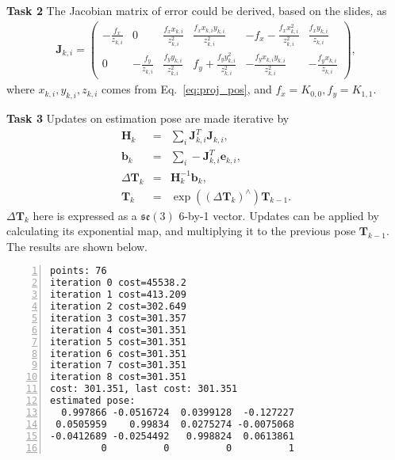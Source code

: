 \documentclass[12pt,a4paper]{article}
\newcommand{\vct}[1]{\boldsymbol{#1}}
\newcommand{\mtx}[1]{\mathbf{#1}}
\begin{document}
    \textsf{\textbf{Task 2}}
    The Jacobian matrix of error could be derived,
    based on the slides,
    as
    \begin{eqnarray}
      \mtx{J}_{k,i} = \begin{pmatrix}
        -\frac{f_x}{z_{k,i}} & 0 & \frac{f_x  x_{k,i}}{z_{k,i}^2} & \frac{f_x  x_{k,i} y_{k,i}}{z_{k,i}^2} & -f_x - \frac{f_x  x_{k,i}^2}{z_{k,i}^2} & \frac{f_x y_{k,i}}{z_{k,i}} \\
        0 & -\frac{f_y}{z_{k,i}} & \frac{f_y  y_{k,i}}{z_{k,i}^2} & f_y + \frac{f_y  y_{k,i}^2}{z_{k,i}^2} & -\frac{f_y x_{k,i} y_{k,i}}{z_{k,i}^2} & -\frac{f_y x_{k,i}}{z_{k,i}} 
      \end{pmatrix},
    \end{eqnarray}
    where $x_{k,i}, y_{k,i}, z_{k,i}$ comes from Eq.~\ref{eq:proj_pos},
    and $f_x = K_{0,0}, f_y = K_{1,1}$.

    \textsf{\textbf{Task 3}}
    Updates on estimation pose are made iterative by
    \begin{eqnarray}
      \mtx{H}_k &=& \sum_i \vct{J}_{k,i}^T \vct{J}_{k,i}, \nonumber\\
      \vct{b}_k &=& \sum_i - \vct{J}_{k,i}^T \vct{e}_{k,i} , \nonumber\\
      \Delta \mtx{T}_k &=& \mtx{H}_k^{-1} \vct{b}_k, \nonumber\\
      \mtx{T}_k  &=& \exp((\Delta \mtx{T}_k)^{\wedge})  \mtx{T}_{k-1}.
    \end{eqnarray}
    $\Delta \mtx{T}_k$ here is expressed as a $\mathfrak{se}(3)$ 6-by-1 vector.
    Updates can be applied by calculating its exponential map, 
    and multiplying it to the previous pose $\mtx{T}_{k-1}$.
    The results are shown below.
    \begin{lstlisting}[frame=single,numbers=left]
points: 76
iteration 0 cost=45538.2
iteration 1 cost=413.209
iteration 2 cost=302.649
iteration 3 cost=301.357
iteration 4 cost=301.351
iteration 5 cost=301.351
iteration 6 cost=301.351
iteration 7 cost=301.351
iteration 8 cost=301.351
cost: 301.351, last cost: 301.351
estimated pose: 
  0.997866 -0.0516724  0.0399128  -0.127227
 0.0505959    0.99834  0.0275274 -0.0075068
-0.0412689 -0.0254492   0.998824  0.0613861
         0          0          0          1
    \end{lstlisting}

    
\end{document}
